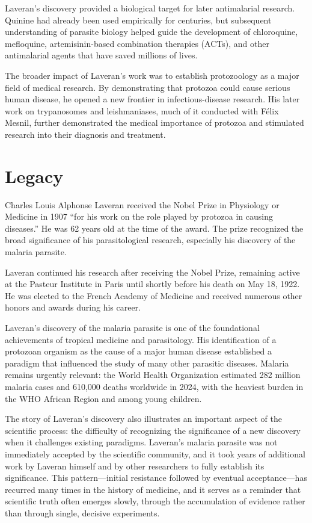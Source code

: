 Laveran's discovery provided a biological target for later antimalarial research. Quinine had already been used empirically for centuries, but subsequent understanding of parasite biology helped guide the development of chloroquine, mefloquine, artemisinin-based combination therapies (ACTs), and other antimalarial agents that have saved millions of lives.

The broader impact of Laveran's work was to establish protozoology as a major field of medical research. By demonstrating that protozoa could cause serious human disease, he opened a new frontier in infectious-disease research. His later work on trypanosomes and leishmaniases, much of it conducted with Félix Mesnil, further demonstrated the medical importance of protozoa and stimulated research into their diagnosis and treatment.

\section{Legacy}

Charles Louis Alphonse Laveran received the Nobel Prize in Physiology or Medicine in 1907 ``for his work on the role played by protozoa in causing diseases.'' He was 62 years old at the time of the award. The prize recognized the broad significance of his parasitological research, especially his discovery of the malaria parasite.\cite{nobel-1907}

Laveran continued his research after receiving the Nobel Prize, remaining active at the Pasteur Institute in Paris until shortly before his death on May 18, 1922. He was elected to the French Academy of Medicine and received numerous other honors and awards during his career.

Laveran's discovery of the malaria parasite is one of the foundational achievements of tropical medicine and parasitology. His identification of a protozoan organism as the cause of a major human disease established a paradigm that influenced the study of many other parasitic diseases. Malaria remains urgently relevant: the World Health Organization estimated 282 million malaria cases and 610,000 deaths worldwide in 2024, with the heaviest burden in the WHO African Region and among young children.\cite{who-malaria-1907}

The story of Laveran's discovery also illustrates an important aspect of the scientific process: the difficulty of recognizing the significance of a new discovery when it challenges existing paradigms. Laveran's malaria parasite was not immediately accepted by the scientific community, and it took years of additional work by Laveran himself and by other researchers to fully establish its significance. This pattern---initial resistance followed by eventual acceptance---has recurred many times in the history of medicine, and it serves as a reminder that scientific truth often emerges slowly, through the accumulation of evidence rather than through single, decisive experiments.


